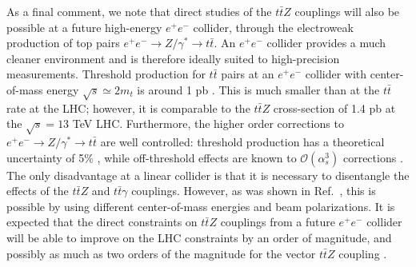 \documentclass{JHEP3}
\def\ttbZ{t\bar{t}Z}
\def\ttb{t\bar{t}}
\begin{document}
As a final comment, we note that direct studies of the $\ttbZ$ couplings will also be possible at a future high-energy $e^+e^-$ collider, through the electroweak production of top pairs $e^+e^- \to Z/\gamma^* \to \ttb$.
An $e^+e^-$ collider provides a much cleaner environment and is therefore ideally suited to high-precision measurements.
Threshold production for $\ttb$ pairs at an $e^+e^-$ collider with center-of-mass energy $\sqrt{s} \simeq 2m_t$  is around 1 pb \cite{Hoang:2013uda}.
This is much smaller than at the $\ttb$ rate at the LHC; however, it is comparable to the $\ttbZ$ cross-section of 1.4 pb at the $\sqrt{s}=13$ TeV LHC. 
Furthermore, the higher order corrections to $e^+e^- \to Z/\gamma^* \to  \ttb$ are well controlled: threshold production has a theoretical uncertainty of 5\% \cite{Hoang:2013uda}, while off-threshold effects are known to $\mathcal{O}(\alpha_s^3)$ corrections \cite{Kiyo:2009gb}.
The only disadvantage at a linear collider is that it is necessary to disentangle the effects of the $\ttbZ$ and $\ttb \gamma$ couplings. 
However, as was shown in Ref.~\cite{AguilarSaavedra:2012vh}, this is possible by using different center-of-mass energies and beam polarizations.
It is expected that the direct constraints on $\ttbZ$ couplings from a future $e^+e^-$ collider will be able to improve on the LHC constraints by an order of magnitude, and possibly as much as two orders of the magnitude for the vector $\ttbZ$ coupling \cite{Adelman:2013gis,Amjad:2013tlv}.
\end{document}
